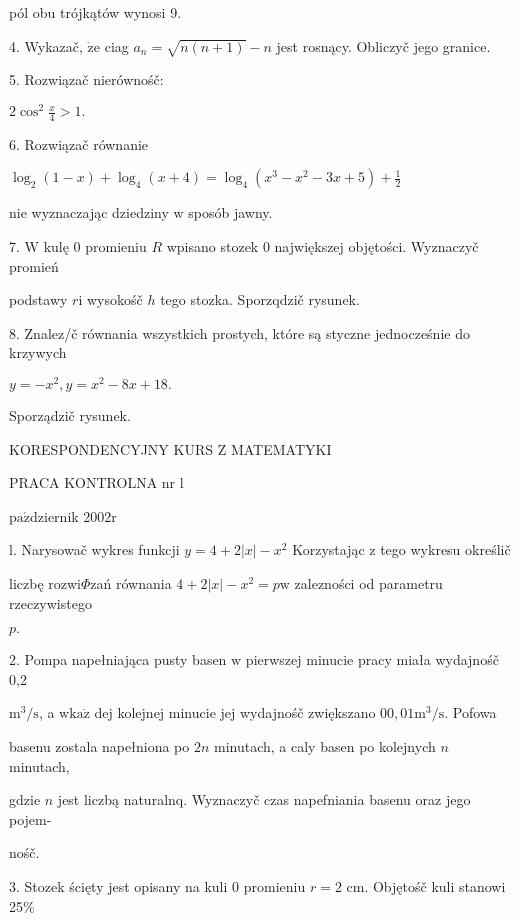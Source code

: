 \documentclass[a4paper,12pt]{article}
\begin{document}
pól obu trójkątów wynosi 9.

4. Wykazač, $\dot{\mathrm{z}}\mathrm{e}$ ciag $a_{n}=\sqrt{n(n+1)}-n$ jest rosnący. Obliczyč jego granice.

5. Rozwiązač nierównośč:

$2\displaystyle \cos^{2}\frac{x}{4}>1.$

6. Rozwiązač równanie

$\displaystyle \log_{2}(1-x)+\log_{4}(x+4)=\log_{4}(x^{3}-x^{2}-3x+5)+\frac{1}{2}$

nie wyznaczając dziedziny $\mathrm{w}$ sposób jawny.

7. $\mathrm{W}$ kulę $0$ promieniu $R$ wpisano stozek $0$ największej objętości. Wyznaczyč promień

podstawy $r\mathrm{i}$ wysokośč $h$ tego stozka. Sporzqdzič rysunek.

8. Znalez/č równania wszystkich prostych, które są styczne jednocześnie do krzywych

$y=-x^{2},y=x^{2}-8x+18.$

Sporządzič rysunek.







KORESPONDENCYJNY KURS Z MATEMATYKI

PRACA KONTROLNA nr l

$\mathrm{p}\mathrm{a}\acute{\mathrm{z}}$dziernik 2$002\mathrm{r}$

l. Narysowač wykres funkcji $y=4+2|x|-x^{2}$ Korzystając $\mathrm{z}$ tego wykresu określič

liczbę rozwi$\Phi$zań równania $4+2|x|-x^{2}=p\mathrm{w}$ zalezności od parametru rzeczywistego

$p.$

2. Pompa napełniająca pusty basen $\mathrm{w}$ pierwszej minucie pracy miała wydajnośč 0,2

$\mathrm{m}^{3}/\mathrm{s}$, a $\mathrm{w}\mathrm{k}\mathrm{a}\dot{\mathrm{z}}$ dej kolejnej minucie jej wydajnośč zwiększano $00,01 \mathrm{m}^{3}/\mathrm{s}$. Pofowa

basenu zostala napełniona po $2n$ minutach, a caly basen po kolejnych $n$ minutach,

gdzie $n$ jest liczbą naturalnq. Wyznaczyč czas napefniania basenu oraz jego pojem-

nośč.

3. Stozek ścięty jest opisany na kuli $0$ promieniu $r=2$ cm. Objętośč kuli stanowi 25\%
\end{document}
